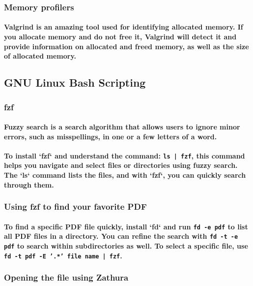\documentclass[11pt]{article}
\begin{document}
\subsubsection{Memory profilers}
\paragraph{\small Valgrind is an amazing tool used for identifying allocated memory. If you allocate memory and do not free it, Valgrind will detect it and provide information on allocated and freed memory, as well as the size of allocated memory.}

\subsection{GNU Linux Bash Scripting}
\subsubsection{fzf}
\paragraph{\small Fuzzy search is a search algorithm that allows users to ignore minor errors, such as misspellings, in one or a few letters of a word.}
\paragraph{\small To install `fzf` and understand the command: \texttt{ls | fzf}, this command helps you navigate and select files or directories using fuzzy search. The `ls` command lists the files, and with `fzf`, you can quickly search through them.}

\subsubsection{Using fzf to find your favorite PDF}
\paragraph{\small To find a specific PDF file quickly, install `fd` and run \texttt{fd -e pdf} to list all PDF files in a directory. You can refine the search with \texttt{fd -t -e pdf} to search within subdirectories as well. To select a specific file, use \texttt{fd -t pdf -E '.*' file name | fzf}.}

\subsubsection{Opening the file using Zathura}
\end{document}
